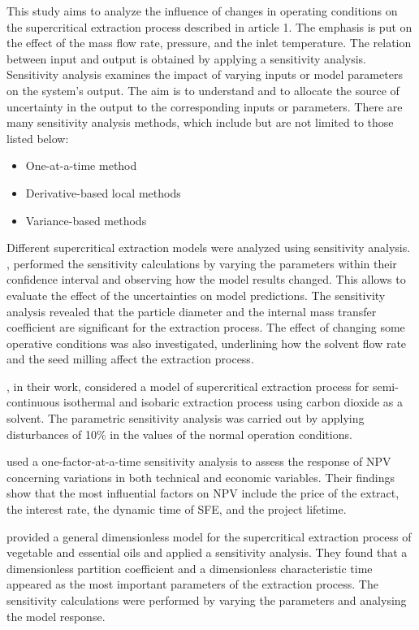 \documentclass[../Article_Sensitivity_Analsysis.tex]{subfiles}
\begin{document}
	
	This study aims to analyze the influence of changes in operating conditions on the supercritical extraction process described in {\color{red}article 1}. The emphasis is put on the effect of the mass flow rate, pressure, and the inlet temperature. The relation between input and output is obtained by applying a sensitivity analysis. Sensitivity analysis examines the impact of varying inputs or model parameters on the system's output. The aim is to understand and to allocate the source of uncertainty in the output to the corresponding inputs or parameters. There are many sensitivity analysis methods, which include but are not limited to those listed below:
	
	\begin{itemize}
		\item One-at-a-time method
		\item Derivative-based local methods
		\item Variance-based methods
	\end{itemize}
	
	Different supercritical extraction models were analyzed using sensitivity analysis. \citet{Fiori_2007}, performed the sensitivity calculations by varying the parameters within their confidence interval and observing how the model results changed. This allows to evaluate the effect of the uncertainties on model predictions. The sensitivity analysis revealed that the particle diameter and the internal mass transfer coefficient are significant for the extraction process. The effect of changing some operative conditions was also investigated, underlining how the solvent flow rate and the seed milling affect the extraction process.
	
	\citet{Santos2000}, in their work, considered a model of supercritical extraction process for semi-continuous isothermal and isobaric extraction process using carbon dioxide as a solvent. The parametric sensitivity analysis was carried out by applying disturbances of 10\% in the values of the normal operation conditions.
	
	\citet{Hatami2024} used a one-factor-at-a-time sensitivity analysis to assess the response of NPV concerning variations in both technical and economic variables. Their findings show that the most influential factors on NPV include the price of the extract, the interest rate, the dynamic time of SFE, and the project lifetime.
	
	\citet{Poletto1996} provided a general dimensionless model for the supercritical extraction process of vegetable and essential oils and applied a sensitivity analysis. They found that a dimensionless partition coefficient and a dimensionless characteristic time appeared as the most important parameters of the extraction process. The sensitivity calculations were performed by varying the parameters and analysing the model response.
	
\end{document}
